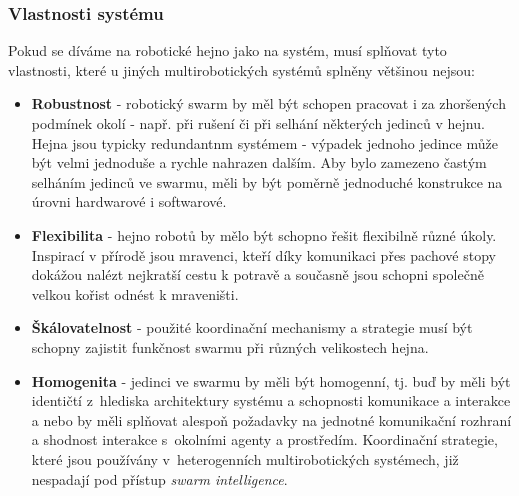 \documentclass[a4paper,12pt]{article}
\begin{document}
\subsubsection{Vlastnosti systému}
Pokud se díváme na robotické hejno jako na systém, musí splňovat tyto vlastnosti,
které u jiných multirobotických systémů splněny většinou nejsou:
\begin{itemize}
  \item {\bf Robustnost} - robotický swarm by měl být schopen pracovat i za zhoršených
    podmínek okolí - např. při rušení či při selhání některých jedinců v hejnu. Hejna
    jsou typicky redundantnm systémem - výpadek jednoho jedince může být velmi jednoduše
    a rychle nahrazen dalším. Aby bylo zamezeno častým selháním jedinců ve swarmu, měli by
    být poměrně jednoduché konstrukce na úrovni hardwarové i softwarové.
  \item {\bf Flexibilita} - hejno robotů by mělo být schopno řešit flexibilně různé úkoly.
    Inspirací v přírodě jsou mravenci, kteří díky komunikaci přes pachové stopy dokážou
    nalézt nejkratší cestu k potravě a současně jsou schopni společně velkou kořist odnést
    k mraveništi.
  \item {\bf Škálovatelnost} - použité koordinační mechanismy a strategie musí být schopny
    zajistit funkčnost swarmu při různých velikostech hejna.
  \item {\bf Homogenita} - jedinci ve swarmu by měli být homogenní, tj. buď by měli
    být identičtí z~hlediska architektury systému a schopnosti komunikace a interakce a
    nebo by měli splňovat alespoň požadavky na jednotné komunikační rozhraní a shodnost
    interakce s~okolními agenty a prostředím. Koordinační strategie, které jsou používány
    v~heterogenních multirobotických systémech, již nespadají pod přístup {\it swarm intelligence}.
\end{itemize}
\end{document}
